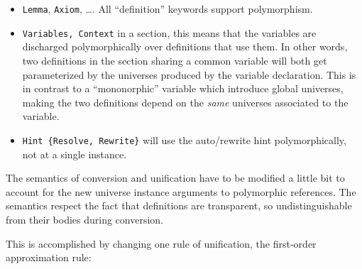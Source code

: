 \begin{itemize}
\item \texttt{Lemma}, \texttt{Axiom}, \ldots. All ``definition''
  keywords support polymorphism.
\item \texttt{Variables, Context} in a section, this means that the
  variables are discharged polymorphically over definitions that use
  them. In other words, two definitions in the section sharing a common
  variable will both get parameterized by the universes produced by the 
  variable declaration. This is in contrast to a ``mononorphic'' variable
  which introduce global universes, making the two definitions depend on
  the \emph{same} universes associated to the variable.
\item \texttt{Hint \{Resolve, Rewrite\}} will use the auto/rewrite hint
  polymorphically, not at a single instance.
\end{itemize}


The semantics of conversion and unification have to be modified a little
bit to account for the new universe instance arguments to polymorphic
references. The semantics respect the fact that definitions are
transparent, so undistinguishable from their bodies during conversion.

This is accomplished by changing one rule of unification, the
first-order approximation rule:










